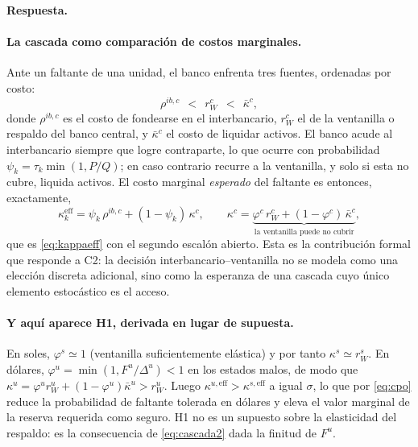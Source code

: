 \documentclass[11pt]{article}
\newcommand{\resp}{\par\noindent\textbf{Respuesta.}\par}
\newcommand{\keff}{\kappa^{\mathrm{eff}}}
\theoremstyle{definition}
\begin{document}
\resp

\paragraph{La cascada como comparaci\'on de costos marginales.} Ante un faltante
de una unidad, el banco enfrenta tres fuentes, ordenadas por costo:
\begin{equation}
\rho^{ib,c}\ \ <\ \ r^{c}_{W}\ \ <\ \ \bar\kappa^{c},
\label{eq:cascada}
\end{equation}
donde $\rho^{ib,c}$ es el costo de fondearse en el interbancario, $r^c_W$ el de
la ventanilla o respaldo del banco central, y $\bar\kappa^c$ el costo de liquidar
activos. El banco acude al interbancario siempre que logre contraparte, lo que
ocurre con probabilidad $\psi_k=\tau_k\min(1,P/Q)$; en caso contrario recurre a
la ventanilla, y solo si esta no cubre, liquida activos. El costo marginal
\emph{esperado} del faltante es entonces, exactamente,
\begin{equation}
\keff_k=\psi_k\,\rho^{ib,c}+(1-\psi_k)\,\kappa^c,
\qquad
\kappa^c=\underbrace{\varphi^c\,r^c_W+(1-\varphi^c)\,\bar\kappa^c}_{\text{la ventanilla puede no cubrir}},
\label{eq:cascada2}
\end{equation}
que es \eqref{eq:kappaeff} con el segundo escal\'on abierto. Esta es la
contribuci\'on formal que responde a C2: la decisi\'on interbancario--ventanilla
no se modela como una elecci\'on discreta adicional, sino como la esperanza de
una cascada cuyo \'unico elemento estoc\'astico es el acceso.

\paragraph{Y aqu\'i aparece H1, derivada en lugar de supuesta.} En soles,
$\varphi^s\simeq1$ (ventanilla suficientemente el\'astica) y por tanto
$\kappa^s\simeq r^s_W$. En d\'olares, $\varphi^u=\min(1,F^u/\Delta^u)<1$ en los
estados malos, de modo que $\kappa^u=\varphi^u r^u_W+(1-\varphi^u)\bar\kappa^u
>r^u_W$. Luego $\kappa^{u,\mathrm{eff}}>\kappa^{s,\mathrm{eff}}$ a igual
$\sigma$, lo que por \eqref{eq:cpo} reduce la probabilidad de faltante tolerada
en d\'olares y eleva el valor marginal de la reserva requerida como seguro. H1 no
es un supuesto sobre la elasticidad del respaldo: es la consecuencia de
\eqref{eq:cascada2} dada la finitud de $F^u$.
\end{document}

